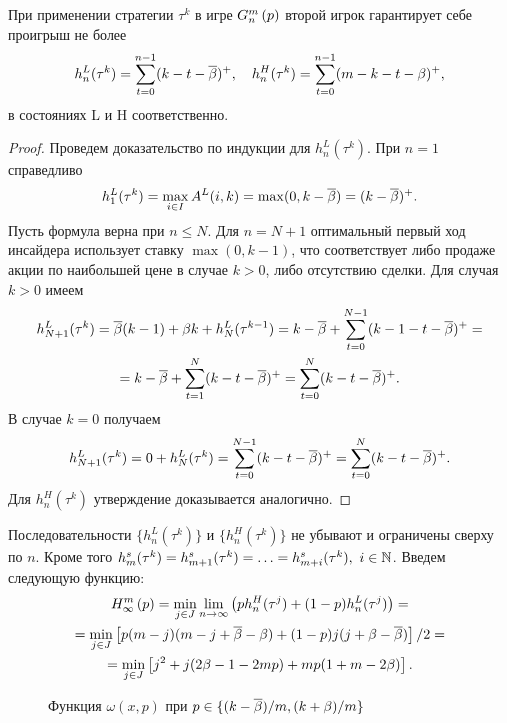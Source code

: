 \begin{proposition}
  \label{proposition:secondPlayerStrategyPayoffs}
  При применении стратегии $\tau^k$ в игре $G_{n}^m\left({p}\right)$ второй игрок
  гарантирует себе проигрыш не более
  \[
    h_n^L(\tau^k) = \sum_{t=0}^{n-1}(k - t - \overline{\beta})^+, \quad h_n^H(\tau^k) =
    \sum_{t=0}^{n-1}(m - k - t - \beta)^+,
  \]
  в состояниях L и H соответственно.
\end{proposition}
\begin{proof}
  Проведем доказательство по индукции для $h^L_n(\tau^k)$. При $n=1$ справедливо
  \[
    h^L_1(\tau^k) = \max_{i \in I} A^L(i, k) = \max(0, k - \overline{\beta}) = (k - \overline{\beta})^+.
  \]
  Пусть формула верна при $n \leq N$. Для $n=N+1$ оптимальный первый ход
  инсайдера использует ставку $\max(0, k - 1)$, что соответствует либо продаже
  акции по наибольшей цене в случае $k > 0$, либо отсутствию сделки. Для случая
  $k > 0$ имеем
  \begin{gather*}
    h^L_{N+1}(\tau^k) = \overline{\beta} (k-1) + \beta k + h^L_N(\tau^{k-1}) =
    k - \overline{\beta} + \sum_{t=0}^{N-1}(k - 1 - t - \overline{\beta})^+ = \\
    = k - \overline{\beta} + \sum_{t=1}^N(k-t-\overline{\beta})^+ = \sum_{t=0}^N(k-t-\overline{\beta})^+.
  \end{gather*}
  В случае $k = 0$ получаем
  \begin{gather*}
    h^L_{N+1}(\tau^k) = 0 + h^L_N(\tau^k) = \sum_{t=0}^{N-1}(k-t-\overline{\beta})^+ = \sum_{t=0}^N(k-t-\overline{\beta})^+.
  \end{gather*}
  Для $h^H_n(\tau^k)$ утверждение доказывается аналогично.
\end{proof}

Последовательности $\{h_n^L(\tau^k)\}$ и $\{h_n^H(\tau^k)\}$ не убывают и
ограничены сверху по $n$. Кроме того %
$h^s_m(\tau^k) = h^s_{m+1}(\tau^k) = \ldots = h^s_{m+i}(\tau^k),\ i \in \mathbb{N}$.
Введем следующую функцию:
\begin{multline*}
  H_{\infty}^m\left({p}\right) 
  = \min_{j \in J} \lim_{n \rightarrow \infty}\left(
    ph_n^H(\tau^j) + (1-p)h_n^L(\tau^j)
  \right) = \\
  = \min_{j \in J} \left[ p (m - j)(m - j + \overline{\beta} - \beta) + (1 - p)j(j + \beta
    - \overline{\beta}) \right] / 2 = \\
  = \min_{j \in J} \left[ j^2 + j(2\beta - 1 - 2 m p) + m p (1 + m - 2\beta) \right].
\end{multline*}

\begin{figure}[b]
  \centering
  
  \caption{Функция $\omega(x,p)$ при $p \in \{(k-\overline{\beta})/m, (k+\beta)/m\}$}
  \label{fig:ch1:omega(x,p)}
\end{figure}

